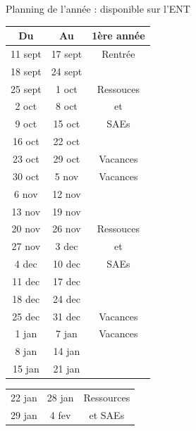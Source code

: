\documentclass [xcolor=x11names,t] {beamer}
\begin{document}
\begin{frame}{Planning de l'année : disponible sur l'ENT} %
\scriptsize
\begin{minipage}{0.45\textwidth}
\begin{tabular}{|c|c|c|}\hline
     \textbf{Du}& \textbf{Au}& \textbf{1ère année} \\ \hline
     \cellcolor{myuniversity!30}11 sept&\cellcolor{myuniversity!30} 17 sept&  \cellcolor{myuniversity!30} Rentrée\\ \hline
     18 sept& 24 sept&  \\ \cline{1-2}
     25 sept& 1 oct & Ressouces \\ \cline{1-2}
      2 oct&  8 oct&  et \\ \cline{1-2}
     9 oct& 15 oct&  SAEs \\ \cline{1-2}
      16 oct&  22 oct&   \\ \hline
     \cellcolor{green!30}23 oct& \cellcolor{green!30}29 oct& \cellcolor{green!30} Vacances \\ \hline
     \cellcolor{green!30}30 oct&\cellcolor{green!30} 5 nov& \cellcolor{green!30} Vacances\\ \hline
      6 nov&  12 nov&  \\ \cline{1-2}
     13 nov& 19 nov&  \\ \cline{1-2}
     20 nov& 26 nov&  Ressouces\\ \cline{1-2}
     27 nov& 3 dec&  et \\ \cline{1-2}
     4 dec& 10 dec&  SAEs\\ \cline{1-2}
      11 dec&  17 dec&   \\ \cline{1-2}
      18 dec& 24 dec&   \\ \hline
     \cellcolor{green!30}25 dec& \cellcolor{green!30}31 dec&\cellcolor{green!30} Vacances \\ \hline
     \cellcolor{green!30}1 jan&\cellcolor{green!30} 7 jan &\cellcolor{green!30} Vacances \\ \hline\hline
      8 jan&  14 jan &   \\ \cline{1-2}
      15 jan& 21 jan&  \\ \hline
\end{tabular}
\end{minipage}\hfill
\begin{minipage}{0.45\textwidth}
\begin{tabular}{|c|c|c|}\hline
	22 jan& 28 jan&  Ressources \\ \cline{1-2}
	29 jan& 4 fev &  et SAEs\\ \cline{1-2}

\end{tabular}
\end{minipage}
\end{frame}
\end{document}
